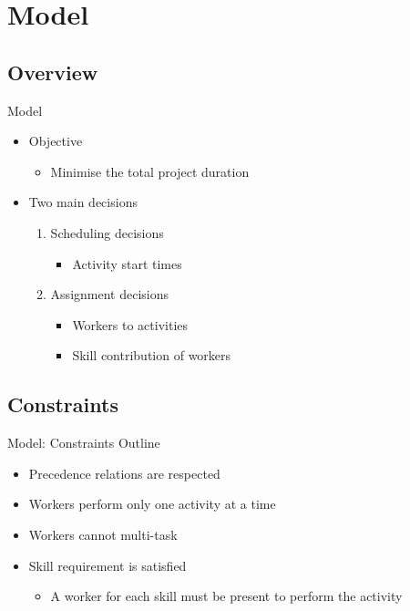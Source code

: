 \documentclass{beamer}
\begin{document}
\section{Model}
\subsection{Overview}
\begin{frame}{Model}
	\begin{itemize}
		\item Objective
		\begin{itemize}
			\item Minimise the total project duration\pause
		\end{itemize}
	\end{itemize}
	\vspace{5mm}
	\begin{itemize}
		\item Two main decisions\pause
		\vspace{2mm}
		\begin{enumerate}
			\item Scheduling decisions
			\begin{itemize}
				\item Activity start times\pause
			\end{itemize}
			\vspace{2mm}
			\item Assignment decisions
			\begin{itemize}
				\item Workers to activities
				\vspace{1mm}
				\item Skill contribution of workers
			\end{itemize}
		\end{enumerate}
	\end{itemize}
\end{frame}

\subsection{Constraints}
\begin{frame}{Model: Constraints Outline}
	\begin{itemize}
		\item Precedence relations are respected\pause
		\vspace{2mm}
		\item Workers perform only one activity at a time\pause
		\vspace{2mm}
		\item Workers cannot multi-task\pause
		\vspace{2mm}
		\item Skill requirement is satisfied
		\begin{itemize}
			\item A worker for each skill must be present to perform the activity
		\end{itemize}
	\end{itemize}
\end{frame}
\end{document}

